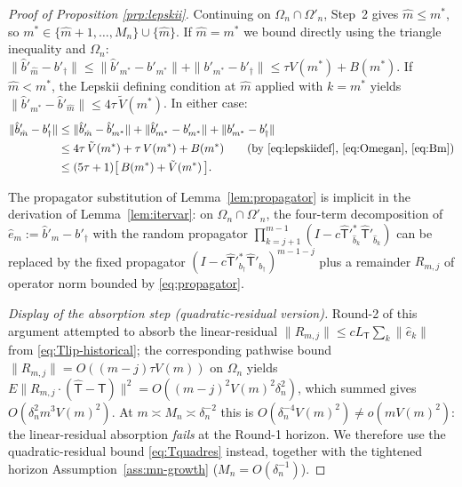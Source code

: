 \begin{proof}[Proof of Proposition \ref{prp:lepskii}]
Continuing on $\Omega_n \cap \Omega'_n$, Step~2 gives $\hat m \le m^*$, so
$m^* \in \{\hat m + 1, \ldots, M_n\} \cup \{\hat m\}$. If $\hat m = m^*$ we
bound directly using the triangle inequality and $\Omega_n$:
$\|\hat b'_{\hat m} - b'_\dagger\| \le \|\hat b'_{m^*} - b'_{m^*}\| +
\|b'_{m^*} - b'_\dagger\| \le \tau V(m^*) + B(m^*)$. If $\hat m < m^*$, the
Lepskii defining condition at $\hat m$ applied with $k = m^*$ yields
$\|\hat b'_{m^*} - \hat b'_{\hat m}\| \le 4\tau\,\tilde V(m^*)$. In either
case:
\begin{align}
\|\hat b'_{\hat m} - b'_\dagger\|
&\le \|\hat b'_{\hat m} - \hat b'_{m^*}\|
  + \|\hat b'_{m^*} - b'_{m^*}\|
  + \|b'_{m^*} - b'_\dagger\| \nonumber\\
&\le 4\tau\,\tilde V(m^*) + \tau\,V(m^*) + B(m^*)
   \qquad \text{(by \eqref{eq:lepskiidef}, \eqref{eq:Omegan}, \eqref{eq:Bm})}
   \nonumber\\
&\le (5\tau + 1)\bigl[\,B(m^*) + \tilde V(m^*)\,\bigr].
   \label{eq:on-event}
\end{align}

The propagator substitution of Lemma~\ref{lem:propagator} %
is implicit in the derivation of Lemma~\ref{lem:itervar}: on $\Omega_n \cap
\Omega'_n$, the four-term decomposition of $\hat e_m := \hat b'_m - b'_\dagger$
with the random propagator $\prod_{k=j+1}^{m-1}(I - c\hat{\mathsf T}'^*_{\hat b_k}\hat{\mathsf T}'_{\hat b_k})$
can be replaced by the fixed propagator
$(I - c\hat{\mathsf T}'^*_{b_\dagger}\hat{\mathsf T}'_{b_\dagger})^{m-1-j}$ plus a
remainder $R_{m,j}$ of operator norm bounded by \eqref{eq:propagator}.

\emph{Display of the absorption step (quadratic-residual version).}
Round-2 of this argument attempted to absorb the linear-residual
$\|R_{m,j}\| \le cL_{\mathsf T}\sum_k\|\hat e_k\|$ from \eqref{eq:Tlip-historical};
the corresponding pathwise bound $\|R_{m,j}\| = O((m-j)\tau V(m))$ on
$\Omega_n$ yields
$E\|R_{m,j}\cdot(\hat{\mathsf T}-\mathsf T)\|^{2}
= O((m-j)^{2}V(m)^{2}\delta_n^{2})$, which summed gives
$O(\delta_n^{2}m^{3}V(m)^{2})$. At
$m \asymp M_n \asymp \delta_n^{-2}$ this is $O(\delta_n^{-4}V(m)^{2})
\not= o(m V(m)^{2})$: the linear-residual absorption \emph{fails} at the
Round-1 horizon. We therefore use the quadratic-residual bound
\eqref{eq:Tquadres} instead, together with the tightened horizon
Assumption~\ref{ass:mn-growth} ($M_n = O(\delta_n^{-1})$).


\end{proof}
